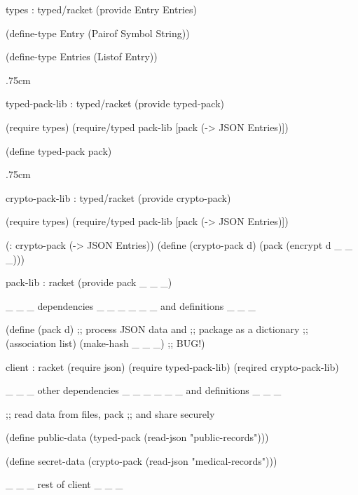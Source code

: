 \def\spacrr{.75cm}
\begin{figure*}[bh] \footnotesize

\begin{minipage}[b]{6.1cm}
\begin{module}{types : typed/racket}\typecolor
(provide Entry Entries)

(define-type Entry
  (Pairof Symbol String))

(define-type Entries
  (Listof Entry))
\end{module}

\vspace\spacrr

\begin{module}{typed-pack-lib : typed/racket}\typecolor
(provide typed-pack)

(require types)
(require/typed pack-lib
  [pack (-> JSON Entries)])

(define typed-pack pack) 
\end{module}

\vspace\spacrr

\begin{module}{crypto-pack-lib : typed/racket}\typecolor
(provide crypto-pack) 

(require types)
(require/typed pack-lib
 [pack (-> JSON Entries)])

(: crypto-pack (-> JSON Entries))
(define (crypto-pack d)
  (pack (encrypt d _ _ _)))
\end{module}\end{minipage}\hfil\begin{minipage}[b]{6.1cm}
\begin{module}{pack-lib : racket}\dyncolor
(provide pack _ _ _)

_ _ _  dependencies     _ _ _
_ _ _  and definitions  _ _ _

(define (pack d)
  ;; process JSON data and 
  ;; package as a dictionary
  ;; (association list)
  (make-hash _ _ _) ;; BUG!)
\end{module}
\begin{module}{client : racket}\dyncolor
(require json)
(require typed-pack-lib)
(reqired crypto-pack-lib)

_ _ _ other dependencies _ _ _
_ _ _ and definitions    _ _ _
          
;; read data from files, pack 
;; and share securely 

(define public-data 
  (typed-pack 
   (read-json 
    "public-records")))

(define secret-data 
  (crypto-pack 
   (read-json 
    "medical-records")))
 
 _ _ _ rest of client _ _ _
\end{module}
\end{minipage}


\caption{One mix-typed program, three interpretations} \label{fig:example}
\end{figure*}
